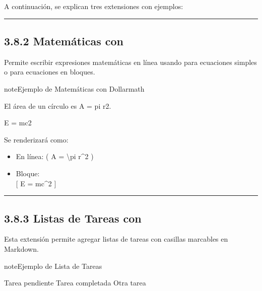 \documentclass[a4paper,10pt,spanish]{sphinxmanual}
\begin{document}
\sphinxAtStartPar
A continuación, se explican tres extensiones con ejemplos:


\bigskip\hrule\bigskip



\subsection{3.8.2 Matemáticas con }
\label{\detokenize{3_guia_myst/extensiones:matematicas-con-dollarmath}}
\sphinxAtStartPar
Permite escribir expresiones matemáticas en línea usando \sphinxcode{\sphinxupquote{\$}} para ecuaciones simples o \sphinxcode{\sphinxupquote{\$\$}} para ecuaciones en bloques.

\begin{sphinxadmonition}{note}{Ejemplo de Matemáticas con Dollarmath}

\begin{sphinxVerbatim}[commandchars=\\\{\}]
El área de un círculo es \PYGZdl{}A = \PYGZbs{}pi r\PYGZca{}2\PYGZdl{}.

\PYGZdl{}\PYGZdl{}
E = mc\PYGZca{}2
\PYGZdl{}\PYGZdl{}
\end{sphinxVerbatim}
\end{sphinxadmonition}

\sphinxAtStartPar
Se renderizará como:
\begin{itemize}
\item {} 
\sphinxAtStartPar
En línea: ( A = \textbackslash{}pi r\textasciicircum{}2 )

\item {} 
\sphinxAtStartPar
Bloque:\\
{[}
E = mc\textasciicircum{}2
{]}

\end{itemize}


\bigskip\hrule\bigskip



\subsection{3.8.3 Listas de Tareas con }
\label{\detokenize{3_guia_myst/extensiones:listas-de-tareas-con-tasklist}}
\sphinxAtStartPar
Esta extensión permite agregar listas de tareas con casillas marcables en Markdown.

\begin{sphinxadmonition}{note}{Ejemplo de Lista de Tareas}

\begin{sphinxVerbatim}[commandchars=\\\{\}]
 Tarea pendiente
 Tarea completada
 Otra tarea
\end{sphinxVerbatim}
\end{sphinxadmonition}
\end{document}

